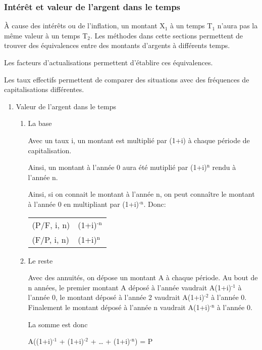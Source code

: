 \documentclass[11pt]{article}
\begin{document}
\subsubsection{Intérêt et valeur de l'argent dans le temps}
\label{sec:org4cf2016}
À cause des intérêts ou de l'inflation, un montant X\(_{\text{1}}\) à un temps T\(_{\text{1}}\) n'aura pas
la même valeur à un temps T\(_{\text{2}}\).  Les méthodes dans cette sections permettent de
trouver des équivalences entre des montants d'argents à différents temps.

Les facteurs d'actualisations permettent d'établire ces équivalences.

Les taux effectifs permettent de comparer des situations avec des fréquences de
capitalisations différentes.
\begin{enumerate}
\item Valeur de l'argent dans le temps
\label{sec:org9560b6b}

\begin{enumerate}
\item La base
\label{sec:org323ed20}

Avec un taux i, un montant est multiplié par (1+i) à chaque période de
capitalisation.

Ainsi, un montant à l'année 0 aura été mutiplié par (1+i)\(^{\text{n}}\) rendu à l'année n.

Ainsi, si on connait le montant à l'année n, on peut connaître le montant à
l'année 0 en multipliant par (1+i)\(^{\text{-n}}\).  Donc:

\begin{center}
\begin{tabular}{ll}
(P/F, i, n) & (1+i)\(^{\text{-n}}\)\\
(F/P, i, n) & (1+i)\(^{\text{n}}\)\\
\end{tabular}
\end{center}

\item Le reste
\label{sec:orgc9a92e4}

Avec des annuités, on dépose un montant A à chaque période. Au bout de n années,
le premier montant A déposé à l'année vaudrait A(1+i)\(^{\text{-1}}\) à l'année 0, le montant
déposé à l'année 2 vaudrait A(1+i)\(^{\text{-2}}\) à l'année 0.  Finalement le montant déposé
à l'année n vaudrait A(1+i)\(^{\text{-n}}\) à l'année 0.

La somme est donc

A((1+i)\(^{\text{-1}}\) + (1+i)\(^{\text{-2}}\) + \dots{} + (1+i)\(^{\text{-n}}\)) = P


\end{enumerate}
\end{enumerate}
\end{document}
